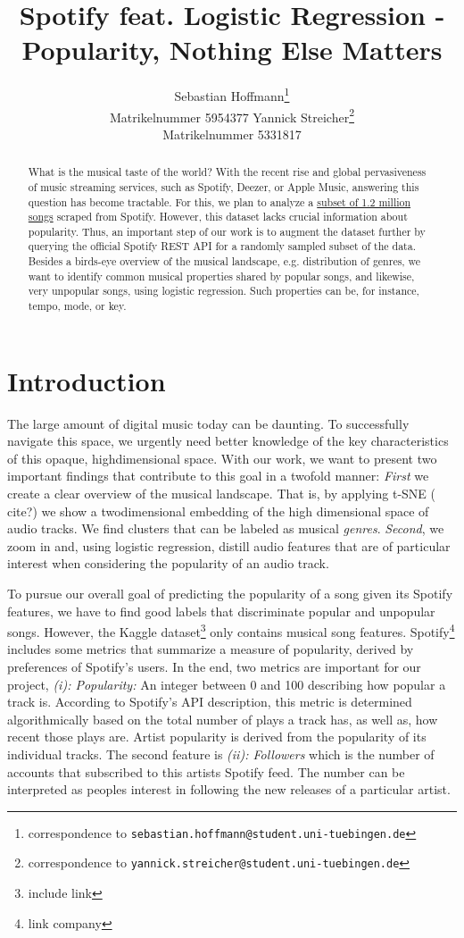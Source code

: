 \documentclass{article}
\title{Spotify feat. Logistic Regression - \\ Popularity, Nothing Else Matters}
\author{%
  Sebastian Hoffmann\thanks{correspondence to \texttt{sebastian.hoffmann@student.uni-tuebingen.de}}\\
  Matrikelnummer 5954377
  \And
  Yannick Streicher\thanks{correspondence to \texttt{yannick.streicher@student.uni-tuebingen.de}}\\
  Matrikelnummer 5331817
}
\newcommand{\todo}[1]{{\color{red} #1}}
\begin{document}
\maketitle

\begin{abstract}
  What is the musical taste of the world? With the recent rise and global pervasiveness of music streaming services, such as Spotify, Deezer, or Apple Music, answering this question has become tractable. For this, we plan to analyze a \href{https://www.kaggle.com/rodolfofigueroa/spotify-12m-songs}{subset of 1.2 million songs} scraped from Spotify. However, this dataset lacks crucial information about popularity. Thus, an important step of our work is to augment the dataset further by querying the official Spotify REST API for a randomly sampled subset of the data. Besides a birds-eye overview of the musical landscape, e.g. distribution of genres, we want to identify common musical properties shared by popular songs, and likewise, very unpopular songs, using logistic regression. Such properties can be, for instance, tempo, mode, or key.
\end{abstract}

\section{Introduction}
The large amount of digital music today can be daunting. To successfully navigate this space, we urgently need better knowledge of the key characteristics of this opaque, highdimensional space. With our work, we want to present two important findings that contribute to this goal in a twofold manner: \textit{First} we create a clear overview of the musical landscape. That is, by applying t-SNE (\todo{cite?}) we show a twodimensional embedding of the high dimensional space of audio tracks. We find clusters that can be labeled as musical \textit{genres}. \textit{Second}, we zoom in and, using logistic regression, distill audio features that are of particular interest when considering the popularity of an audio track.

To pursue our overall goal of predicting the popularity of a song given its Spotify features, we have to find good labels that discriminate popular and unpopular songs. However, the Kaggle dataset\footnote{include link} only contains musical song features. Spotify\footnote{link company} includes some metrics that summarize a measure of popularity, derived by preferences of Spotify's users. In the end, two metrics are important for our project, \textit{(i): Popularity:} An integer between 0 and 100 describing how popular a track is. According to Spotify's API description, this metric is determined algorithmically based on the total number of plays a track has, as well as, how recent those plays are. Artist popularity is derived from the popularity of its individual tracks. The second feature is \textit{(ii): Followers} which is the number of accounts that subscribed to this artists Spotify feed. The number can be interpreted as peoples interest in following the new releases of a particular artist.
\end{document}
